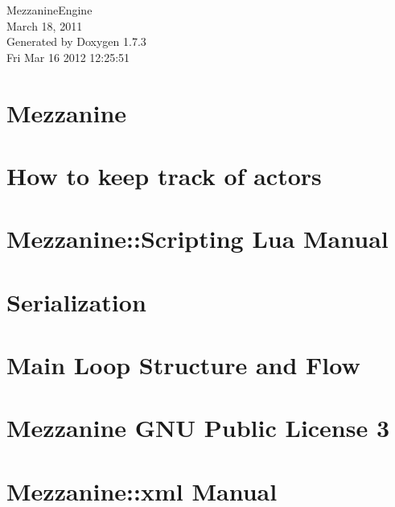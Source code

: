 \documentclass[a4paper]{article}
\begin{document}
\hypersetup{pageanchor=false}
\begin{titlepage}
\vspace*{7cm}
\begin{center}
{\Large MezzanineEngine \\[1ex]\large March 18, 2011 }\\
\vspace*{1cm}
{\large Generated by Doxygen 1.7.3}\\
\vspace*{0.5cm}
{\small Fri Mar 16 2012 12:25:51}\\
\end{center}
\end{titlepage}
\tableofcontents
{}
\hypersetup{pageanchor=true}
\section{Mezzanine}
\label{index}\hypertarget{index}{}
\section{How to keep track of actors}
\label{actorcontainer1}
\hypertarget{actorcontainer1}{}

\section{Mezzanine::Scripting Lua Manual}
\label{LuaManual}
\hypertarget{LuaManual}{}

\section{Serialization}
\label{Serialization}
\hypertarget{Serialization}{}

\section{Main Loop Structure and Flow}
\label{mainloop1}
\hypertarget{mainloop1}{}

\section{Mezzanine GNU Public License 3}
\label{GPLLicense}
\hypertarget{GPLLicense}{}

\section{Mezzanine::xml Manual}
\label{XMLManual}
\hypertarget{XMLManual}{}

\end{document}
